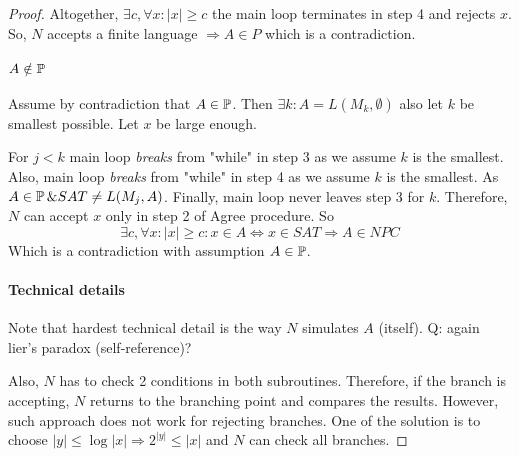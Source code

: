 \begin{proof}
	Altogether, $\exists c, \forall x: |x| \geq c$ the main loop terminates in step 4 and rejects $x$.
	So, $N$ accepts a finite language $\Rightarrow A \in P$ which is a contradiction.

	\paragraph{$A \notin \operatorname{\mathbb{P}}$} Assume by contradiction that $A \in \operatorname{\mathbb{P}}$.
	Then $\exists k: A = L(M_k, \emptyset)$ also let $k$ be smallest possible.
	Let $x$ be large enough.

	For $j < k$ main loop \emph{breaks} from "while" in step 3 as we assume $k$ is the smallest.
	Also, main loop \emph{breaks} from "while" in step 4 as we assume $k$ is the smallest.
	As $A \in \operatorname{\mathbb{P}} \& SAT \ne L(M_j, A)$.
	Finally, main loop never leaves step 3 for $k$.
	Therefore, $N$ can accept $x$ only in step 2 of Agree procedure.
	So
	\[ \exists c, \forall x: |x| \geq c: x \in A \iff x \in SAT \Rightarrow A \in NPC \]
	Which is a contradiction with assumption $A \in \operatorname{\mathbb{P}}$.

	\paragraph{Technical details}
	Note that hardest technical detail is the way $N$ simulates $A$ (itself).
	Q: again lier's paradox (self-reference)?

	Also, $N$ has to check 2 conditions in both subroutines.
	Therefore, if the branch is accepting, $N$ returns to the branching point and compares the results.
	However, such approach does not work for rejecting branches.
	One of the solution is to choose $|y| \leq \log |x| \Rightarrow 2^{|y|} \leq |x|$ and $N$ can check all branches.
\end{proof}
